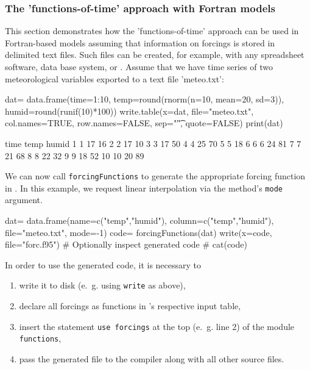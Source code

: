 \documentclass[times,onecolumn]{article}
\begin{document}
\subsubsection{The 'functions-of-time' approach with Fortran models}

This section demonstrates how the 'functions-of-time' approach can be used in Fortran-based models assuming that information on forcings is stored in delimited text files. Such files can be created, for example, with any spreadsheet software, data base system, or . Assume that we have time series of two meteorological variables exported to a text file 'meteo.txt':

\begin{Schunk}
\begin{Sinput}
 dat= data.frame(time=1:10, temp=round(rnorm(n=10, mean=20, sd=3)),
   humid=round(runif(10)*100))
 write.table(x=dat, file="meteo.txt", col.names=TRUE,
   row.names=FALSE, sep="\t", quote=FALSE)
 print(dat)
\end{Sinput}
\begin{Soutput}
   time temp humid
1     1   17    16
2     2   17    10
3     3   17    50
4     4   25    70
5     5   18     6
6     6   24    81
7     7   21    68
8     8   22    32
9     9   18    52
10   10   20    89
\end{Soutput}
\end{Schunk}

We can now call \verb|forcingFunctions| to generate the  appropriate forcing function in . In this example, we request linear interpolation via the method's \verb|mode| argument.

\begin{Schunk}
\begin{Sinput}
 dat= data.frame(name=c("temp","humid"),
   column=c("temp","humid"), file="meteo.txt", mode=-1)
 code= forcingFunctions(dat)
 write(x=code, file="forc.f95")
 # Optionally inspect generated code
 # cat(code)
\end{Sinput}
\end{Schunk}

In order to use the generated code, it is necessary to
\begin{enumerate}
\item write it to disk (e.~g. using \verb|write| as above),
\item declare all forcings as functions in 's respective input table,
\item insert the statement \verb|use forcings| at the top (e.~g. line 2) of the  module \verb|functions|,
\item pass the generated file to the compiler along with all other  source files.
\end{enumerate}
\end{document}
